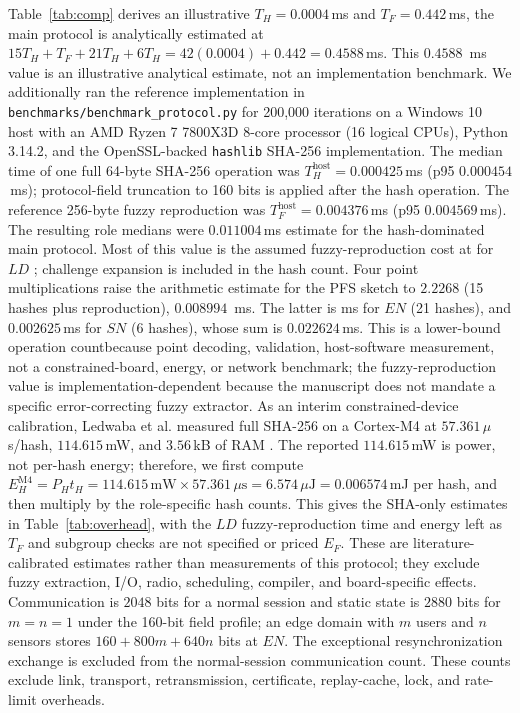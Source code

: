 \documentclass[cmc,article,submit,moreauthors,pdftex]{Definitions/tsp}
\providecommand{\DIFadd}[1]{{\protect\color{blue} \sf #1}} %
\providecommand{\DIFdel}[1]{{\protect\color{red} \scriptsize #1}} %
\providecommand{\DIFaddbegin}{} %
\providecommand{\DIFaddend}{} %
\providecommand{\DIFdelbegin}{} %
\providecommand{\DIFdelend}{} %
\begin{document}
\DIFdel{Table~\ref{tab:comp} derives an illustrative }\DIFdelend \DIFaddbegin \DIFadd{$T_H=0.0004$\,ms and $T_F=0.442$\,ms, the main protocol is analytically estimated at $15T_H+T_F+21T_H+6T_H=42(0.0004)+0.442=0.4588$\,ms. This }\DIFaddend $0.4588$\,\DIFaddbegin \DIFadd{ms value is an illustrative analytical estimate, not an implementation benchmark. We additionally ran the reference implementation in \texttt{benchmarks/benchmark\_protocol.py} for 200,000 iterations on a Windows 10 host with an AMD Ryzen 7 7800X3D 8-core processor (16 logical CPUs), Python 3.14.2, and the OpenSSL-backed \texttt{hashlib} SHA-256 implementation. The median time of one full 64-byte SHA-256 operation was $T_H^{\mathrm{host}}=0.000425$\,ms (p95 $0.000454$\,ms); protocol-field truncation to 160 bits is applied after the hash operation. The reference 256-byte fuzzy reproduction was $T_F^{\mathrm{host}}=0.004376$\,ms (p95 $0.004569$\,ms). The resulting role medians were $0.011004$\,}\DIFaddend ms \DIFdelbegin \DIFdel{estimate for the hash-dominated main protocol. Most of this value is the assumed fuzzy-reproduction cost at }\DIFdelend \DIFaddbegin \DIFadd{for }\DIFaddend $LD$ \DIFdelbegin \DIFdel{; challenge expansion is included in the hash count. Four point multiplications raise the arithmetic estimate for the PFS sketch to $2.2268$}\DIFdelend \DIFaddbegin \DIFadd{(15 hashes plus reproduction), $0.008994$}\DIFaddend \,\DIFdelbegin \DIFdel{ms. The latter is }\DIFdelend \DIFaddbegin \DIFadd{ms for $EN$ (21 hashes), and $0.002625$\,ms for $SN$ (6 hashes), whose sum is $0.022624$\,ms. This is }\DIFaddend a \DIFdelbegin \DIFdel{lower-bound operation countbecause point decoding, validation, }\DIFdelend \DIFaddbegin \DIFadd{host-software measurement, not a constrained-board, energy, or network benchmark; the fuzzy-reproduction value is implementation-dependent because the manuscript does not mandate a specific error-correcting fuzzy extractor. As an interim constrained-device calibration, Ledwaba et al. measured full SHA-256 on a Cortex-M4 at $57.361$\,$\mu$s/hash, $114.615$\,mW, and $3.56$\,kB of RAM \cite{ledwaba2018cortex}. The reported $114.615$\,mW is power, not per-hash energy; therefore, we first compute $E_H^{\mathrm{M4}}=P_H t_H=114.615\,\mathrm{mW}\times57.361\,\mu\mathrm{s}=6.574\,\mu\mathrm{J}=0.006574$\,mJ per hash, and then multiply by the role-specific hash counts. This gives the SHA-only estimates in Table~\ref{tab:overhead}, with the $LD$ fuzzy-reproduction time and energy left as $T_F$ }\DIFaddend and \DIFdelbegin \DIFdel{subgroup checks are not specified or priced}\DIFdelend \DIFaddbegin \DIFadd{$E_F$. These are literature-calibrated estimates rather than measurements of this protocol; they exclude fuzzy extraction, I/O, radio, scheduling, compiler, and board-specific effects. Communication is $2048$ bits for a normal session and static state is $2880$ bits for $m=n=1$ under the 160-bit field profile; an edge domain with $m$ users and $n$ sensors stores $160+800m+640n$ bits at $EN$. The exceptional resynchronization exchange is excluded from the normal-session communication count. These counts exclude link, transport, retransmission, certificate, replay-cache, lock, and rate-limit overheads}\DIFaddend .
\end{document}
